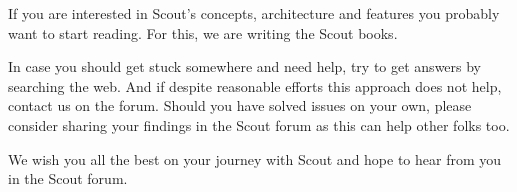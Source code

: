 \documentclass{article}
\begin{document}

If you are interested in Scout's concepts, architecture and features you probably want to start reading. 
For this, we are writing the Scout books. 


In case you should get stuck somewhere and need help, try to get answers by searching the web. 
And if despite reasonable efforts this approach does not help, contact us on the forum. 
Should you have solved issues on your own, please consider sharing your findings in the Scout forum as this can help other folks too. 


We wish you all the best on your journey with Scout and hope to hear from you in the Scout forum.
\end{document}

